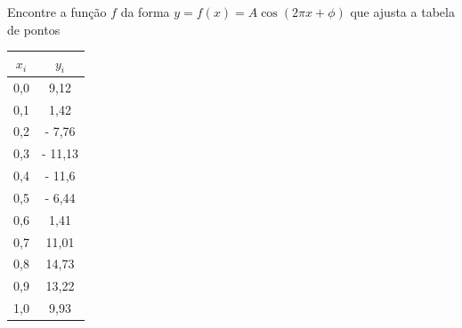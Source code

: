 \begin{ex}
Encontre a função $f$ da forma $y=f(x)=A\cos(2 \pi x+\phi)$ que ajusta a tabela de pontos
\begin{center}
\begin{tabular}{|c|c|}
\hline
$x_i$ & $y_i$\\
\hline
0,0  &   9,12\\
0,1  &    1,42\\
0,2  &  - 7,76\\
0,3  &  - 11,13\\
0,4  &  - 11,6\\
0,5  &  - 6,44\\
0,6  &    1,41\\
0,7  &    11,01\\
0,8  &    14,73\\
0,9  &    13,22\\
1,0  &    9,93 \\
\hline
\end{tabular}
\end{center}
\end{ex}
